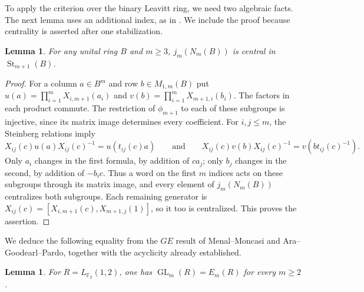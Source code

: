 \documentclass[11pt]{amsart}
\newcommand{\F}{\mathbb F}
\DeclareMathOperator{\GL}{GL}
\DeclareMathOperator{\St}{St}
\newtheorem{lemma}[theorem]{Lemma}
\theoremstyle{definition}
\theoremstyle{remark}
\numberwithin{equation}{section}
\begin{document}
To apply the criterion over the binary Leavitt ring, we need two algebraic facts. The next lemma uses an additional index, as in \cite[Chapter~III, proof of Theorem~5.2.1]{Weibel13}. We include the proof because centrality is asserted after one stabilization.

\begin{lemma}
\label{lem:padded-centrality}
For any unital ring $B$ and $m\geq3$, $j_m(N_m(B))$ is central in $\St_{m+1}(B)$.
\end{lemma}

\begin{proof}
For a column $a\in B^m$ and row $b\in M_{1,m}(B)$ put $u(a)=\prod_{i=1}^mX_{i,m+1}(a_i)$ and $v(b)=\prod_{i=1}^mX_{m+1,i}(b_i)$. The factors in each product commute. The restriction of $\phi_{m+1}$ to each of these subgroups is injective, since its matrix image determines every coefficient. For $i,j\leq m$, the Steinberg relations imply
$$
X_{ij}(c)u(a)X_{ij}(c)^{-1}=u(t_{ij}(c)a)\qquad\text{and}\qquad X_{ij}(c)v(b)X_{ij}(c)^{-1}=v(bt_{ij}(c)^{-1}).
$$
Only $a_i$ changes in the first formula, by addition of $ca_j$; only $b_j$ changes in the second, by addition of $-b_i c$. Thus a word on the first $m$ indices acts on these subgroups through its matrix image, and every element of $j_m(N_m(B))$ centralizes both subgroups. Each remaining generator is $X_{ij}(c)=[X_{i,m+1}(c),X_{m+1,j}(1)]$, so it too is centralized. This proves the assertion.
\end{proof}

We deduce the following equality from the $GE$ result of Menal--Moncasi and Ara--Goodearl--Pardo, together with the acyclicity already established.

\begin{lemma}
\label{lem:elementary-generation}
For $R=L_{\F_2}(1,2)$, one has $\GL_m(R)=E_m(R)$ for every $m\geq2$.
\end{lemma}
\end{document}
